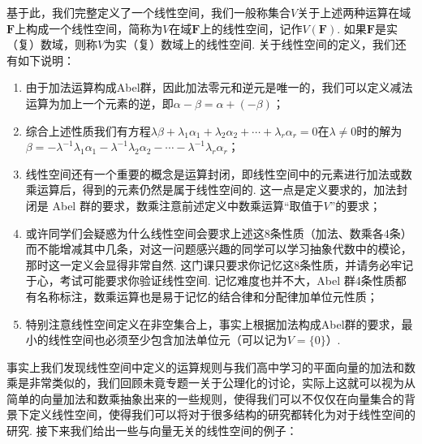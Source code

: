 基于此，我们完整定义了一个线性空间，我们一般称集合$V$关于上述两种运算在域$\mathbf{F}$上构成一个线性空间，简称为$V$在域$\mathbf{F}$上的线性空间，记作$V(\mathbf{F})$. 如果$\mathbf{F}$是实（复）数域，则称$V$为实（复）数域上的线性空间. 关于线性空间的定义，我们还有如下说明：
\begin{enumerate}
    \item 由于加法运算构成Abel群，因此加法零元和逆元是唯一的，我们可以定义减法运算为加上一个元素的逆，即$\alpha-\beta=\alpha+(-\beta)$；

    \item 综合上述性质我们有方程$\lambda\beta+\lambda_1\alpha_1+\lambda_2\alpha_2+\cdots+\lambda_r\alpha_r=0$在$\lambda\neq 0$时的解为$\beta=-\lambda^{-1}\lambda_1\alpha_1-\lambda^{-1}\lambda_2\alpha_2-\cdots-\lambda^{-1}\lambda_r\alpha_r$；

    \item 线性空间还有一个重要的概念是运算封闭，即线性空间中的元素进行加法或数乘运算后，得到的元素仍然是属于线性空间的. 这一点是定义要求的，加法封闭是 Abel 群的要求，数乘注意前述定义中数乘运算``取值于$V$''的要求；

    \item 或许同学们会疑惑为什么线性空间会要求上述这8条性质（加法、数乘各4条）而不能增减其中几条，对这一问题感兴趣的同学可以学习抽象代数中的模论，那时这一定义会显得非常自然. 这门课只要求你记忆这8条性质，并请务必牢记于心，考试可能要求你验证线性空间. 记忆难度也并不大，Abel 群4条性质都有名称标注，数乘运算也是易于记忆的结合律和分配律加单位元性质；

    \item 特别注意线性空间定义在非空集合上，事实上根据加法构成Abel群的要求，最小的线性空间也必须至少包含加法单位元（可以记为$V=\{0\}$）.
\end{enumerate}

事实上我们发现线性空间中定义的运算规则与我们高中学习的平面向量的加法和数乘是非常类似的，我们回顾未竟专题一关于公理化的讨论，实际上这就可以视为从简单的向量加法和数乘抽象出来的一些规则，使得我们可以不仅仅在向量集合的背景下定义线性空间，使得我们可以将对于很多结构的研究都转化为对于线性空间的研究. 接下来我们给出一些与向量无关的线性空间的例子：

